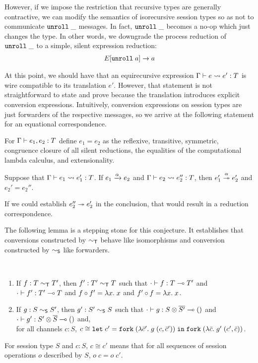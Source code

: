 However, if we impose the restriction that recursive types are
generally contractive, we can modify the semantics of isorecursive
session types so as not to communicate $\EUnroll\_$ messages. In fact,
$\EUnroll\_$ becomes a no-op which just changes the type. In other
words, we downgrade the process reduction of $\EUnroll\_$ to a simple,
silent expression reduction:
\begin{gather*}
  \reduce{E[\EUnroll a]}{a}
\end{gather*}

At this point, we should have that an equirecursive expression
$\translation e{e'} T$ is wire compatible to its translation
$e'$. However, that statement is not straightforward to state and
prove because the translation introduces explicit conversion
expressions. Intuitively, conversion expressions on session types are
just forwarders of the respective messages, so we arrive at the
following statement for an equational correspondence.

\begin{definition}
  For $\typing{e_1, e_2} T$ define $e_1 = e_2$
  as the reflexive, transitive, symmetric, congruence closure of all
  silent reductions, the equalities of the computational lambda
  calculus, and extensionality.
\end{definition}

\begin{conjecture}
  Suppose that $\translation {e_1}{e_1'} T$.
  If $\reduce[\alpha]{e_1}{e_2}$
  and $\translation{e_2}{e_2''}{T}$,
  then $\reducemany[\alpha]{e_1'}{e_2'}$
  and $e_2' = e_2''$.
\end{conjecture}
If we could establish $\reducemany{e_2''}{e_2'}$ in  the
conclusion, that would result in a reduction correspondence.

The following lemma is a stepping stone for this conjecture. It
establishes that conversions constructed by $\eqt$ behave like
isomorphisms and conversion constructed by $\eqs$ like forwarders.
\begin{conjecture}[Conversions]~\\[-\baselineskip]
  \label{lemma:conversion}
  \begin{enumerate}
    \item If $f : T \eqt T'$, then $f' : T' \eqt T$
      such that $\typing[\CNil]{f}{\TFun T{T'}}$
      and  $\typing[\CNil]{f'}{\TFun {T'}T}$
      and  $f \circ f' = \ELam x x$
      and  $f' \circ f = \ELam x x$.
    \item If $g : S \eqs S'$, then $g' : S' \eqs S$
      such that $\typing[\CNil]{g}{\TFun {\TPair {S} {\TDual{S'}}} \TUnit}$
      and $\typing[\CNil]{g'}{\TFun {\TPair {S'} {\TDual{S}}} \TUnit}$
      and,\\
      for all channels $c : S$,  $c \cong \ELet{c'}{\EFork{( \ELam {\bar c'} g \; (c, \bar c')) }}{\EFork{( \ELam {\bar c} g' \; (c', \bar c)) }} $.
\end{enumerate}
\end{conjecture}
For session type $S$ and $c:S$, $c \cong c'$ means that for all
sequences of session operations $o$ described by $S$, $o\; c = o\; c'$.


